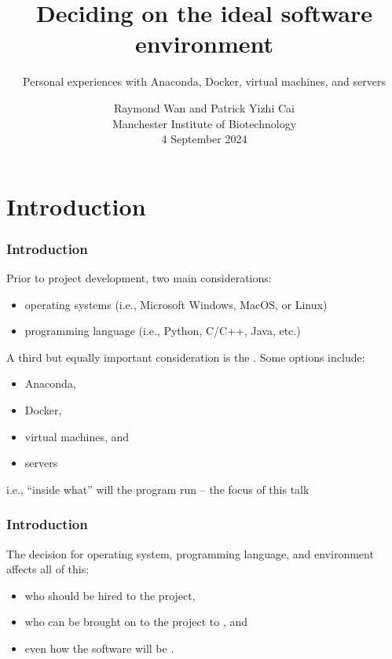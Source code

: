 \documentclass[11pt,aspectratio=43,ignorenonframetext,t]{beamer}
\title{Deciding on the ideal software environment}
\subtitle{Personal experiences with Anaconda, Docker, virtual machines, and servers}
\author{Raymond Wan and Patrick Yizhi Cai\\Manchester Institute of Biotechnology\\4 September 2024}
\newcommand{\hlabel}{\phantomsection\label}
\begin{document}
\begin{frame}
  \titlepage \hlabel{slide:title}
\end{frame}


\section{Introduction}


\begin{frame}

\frametitle{Introduction}

Prior to project development, two main considerations:
\begin{itemize}
  \item operating systems (i.e., Microsoft Windows, MacOS, or Linux) 
  \item programming language (i.e., Python, C/C++, Java, etc.)
\end{itemize}
\vs

A third but equally important consideration is the {}.  Some options include:

\begin{itemize}
  \item Anaconda,
  \item Docker,
  \item virtual machines, and
  \item servers
\end{itemize}

i.e., ``inside what'' will the program run -- the focus of this talk

\end{frame}


\begin{frame}

\frametitle{Introduction}

The decision for operating system, programming language, and environment affects all of this:
\begin{itemize}
  \item who should be hired to {} the project,
  \item who can be brought on to the project to {}, and
  \item even how the software will be {}.
\end{itemize}

\end{frame}
\end{document}
